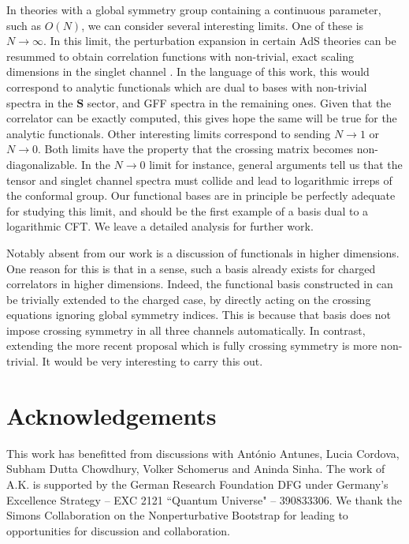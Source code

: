\documentclass[12pt]{article}
\numberwithin{equation}{section}
\newcommand{\mbf}{\mathbf}
\begin{document}
	In theories with a global symmetry group containing a continuous parameter, such as $O(N)$, we can consider several interesting limits. One of these is $N\to \infty$. In this limit, the perturbation expansion in certain AdS theories can be resummed to obtain correlation functions with non-trivial, exact scaling dimensions in the singlet channel  \cite{Carmi:2018qzm}. In the language of this work, this would correspond to analytic functionals which are dual to bases with non-trivial spectra in the $\mbf S$ sector, and GFF spectra in the remaining ones. Given that the correlator can be exactly computed, this gives hope the same will be true for the analytic functionals. Other interesting limits correspond to sending $N\to 1$ or $N\to 0$. Both limits have the property that the crossing matrix becomes non-diagonalizable. In the $N\to 0$ limit for instance, general arguments tell us that the tensor and singlet channel spectra must collide and lead to logarithmic irreps of the conformal group. Our functional bases are in principle be perfectly adequate for studying this limit, and should be the first example of a basis dual to a logarithmic CFT. We leave a detailed analysis for further work.
	
	
	Notably absent from our work is a discussion of functionals in higher dimensions. One reason for this is that in a sense, such a basis already exists for charged correlators in higher dimensions. Indeed, the functional basis constructed in \cite{Mazac:2019shk,Caron-Huot:2020adz} can be trivially extended to the charged case, by directly acting on the crossing equations ignoring global symmetry indices. This is because that basis does not impose crossing symmetry in all three channels automatically. In contrast, extending the more recent proposal \cite{Sinha:2020win,Gopakumar:2021dvg} which is fully crossing symmetry is more non-trivial. It would be very interesting to carry this out.
	
	
	


\section*{Acknowledgements}
This work has benefitted from discussions with António Antunes, Lucia Cordova, Subham Dutta Chowdhury, Volker Schomerus and Aninda Sinha. The work of A.K. is supported by the German Research
Foundation DFG under Germany’s Excellence Strategy -- EXC 2121 ``Quantum Universe" -- 390833306.
We thank the Simons Collaboration on the Nonperturbative Bootstrap for leading to opportunities for discussion and collaboration.
	
\end{document}
